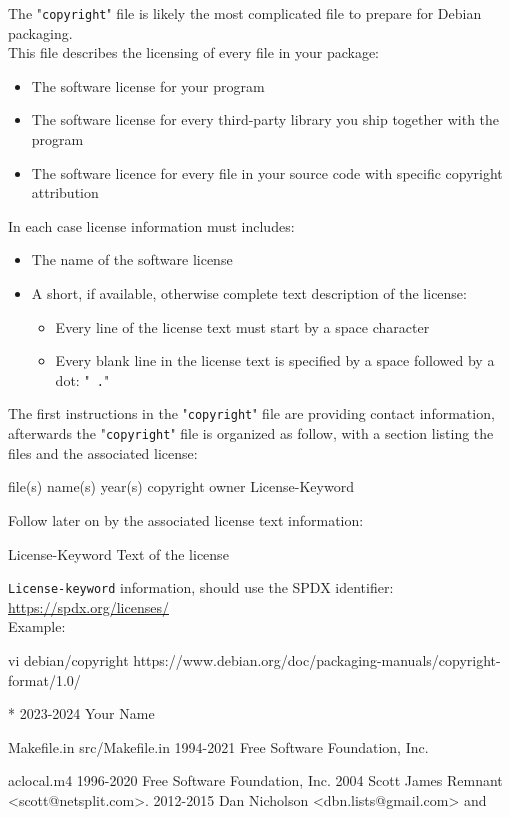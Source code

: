 The "\texttt{copyright}" file is likely the most complicated file to prepare for Debian packaging. \\
This file describes the licensing of every file in your package: 
\begin{itemize}
\item The software license for your program
\item The software license for every third-party library you ship together with the program
\item The software licence for every file in your source code with specific copyright attribution 
\end{itemize}
In each case license information must includes:
\begin{itemize}
\item The name of the software license
\item A short, if available, otherwise complete text description of the license:
\begin{itemize}
\item Every line of the license text must start by a space character
\item Every blank line in the license text is specified by a space followed by a dot: "\texttt{ .}"
\end{itemize}
\end{itemize}
The first instructions in the "\texttt{copyright}" file are providing contact information, afterwards the "\texttt{copyright}" file is organized as follow, 
with a section listing the files and the associated license:
\begin{script}
     file(s) name(s) 
 year(s) copyright owner
   License-Keyword
\end{script}
Follow later on by the associated license text information:
\begin{script}
 License-Keyword
 Text of the license
\end{script}
\noindent \texttt{License-keyword} information, should use the SPDX identifier: \href{https://spdx.org/licenses/}{https://spdx.org/licenses/} \\[0.5cm]
\noindent Example: 
{\footnotesize{
\begin{script}
 vi debian/copyright
 https://www.debian.org/doc/packaging-manuals/copyright-format/1.0/
 
 \var{\email}
 \var{\gitprog/}

      *
 2023-2024 Your Name
   

      Makefile.in
             src/Makefile.in
 1994-2021 Free Software Foundation, Inc.
   

      aclocal.m4
 1996-2020 Free Software Foundation, Inc.
             2004 Scott James Remnant <scott@netsplit.com>.
             2012-2015 Dan Nicholson <dbn.lists@gmail.com>
    and 
\end{script}
}}
